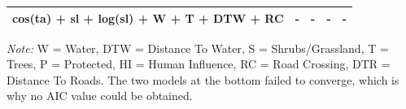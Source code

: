 \documentclass[abstract=off,10pt,a4paper,bibliography=totocnumbered]{article}
\begin{document}
\begin{table}[hbpt]
\begin{center}
{\begin{threeparttable}
\begin{tabular}{lllll}
          cos(ta) + sl + log(sl) + W + T + DTW + RC & - & - & - & - \\
         \bottomrule
       \end{tabular}
       \begin{tablenotes}
         \item \textit{Note:} W = Water, DTW = Distance To Water, S =
         Shrubs/Grassland, T = Trees, P = Protected, HI = Human Influence, RC =
         Road Crossing, DTR = Distance To Roads. The two models at the bottom
         failed to converge, which is why no AIC value could be obtained.
       \end{tablenotes}
     \end{threeparttable}
    }
  \end{center}
\end{table}

\newpage
\begingroup
\singlespacing

\endgroup
\end{document}
